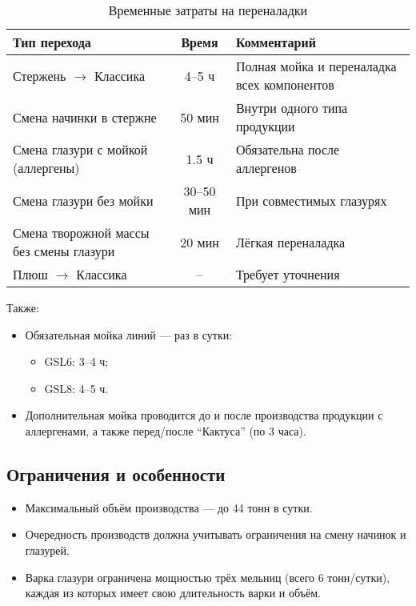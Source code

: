 \begin{table}[h]
\centering
\caption{Временные затраты на переналадки}
\begin{tabularx}{\textwidth}{|l|c|X|}
\hline
\textbf{Тип перехода} & \textbf{Время} & \textbf{Комментарий} \\
\hline
Стержень $\rightarrow$ Классика & 4–5 ч & Полная мойка и переналадка всех компонентов \\
Смена начинки в стержне & 50 мин & Внутри одного типа продукции \\
Смена глазури с мойкой (аллергены) & 1.5 ч & Обязательна после аллергенов \\
Смена глазури без мойки & 30–50 мин & При совместимых глазурях \\
Смена творожной массы без смены глазури & 20 мин & Лёгкая переналадка \\
Плюш $\rightarrow$ Классика & -- & Требует уточнения \\
\hline
\end{tabularx}
\end{table}

Также:
\begin{itemize}
  \item Обязательная мойка линий — раз в сутки:
  \begin{itemize}
    \item GSL6: 3–4 ч;
    \item GSL8: 4–5 ч.
  \end{itemize}
  \item Дополнительная мойка проводится до и после производства продукции с аллергенами, а также перед/после ``Кактуса'' (по 3 часа).
\end{itemize}

\subsection{Ограничения и особенности}
\begin{itemize}
  \item Максимальный объём производства — до 44 тонн в сутки.
  \item Очередность производств должна учитывать ограничения на смену начинок и глазурей.
  \item Варка глазури ограничена мощностью трёх мельниц (всего 6 тонн/сутки), каждая из которых имеет свою длительность варки и объём.
\end{itemize}

